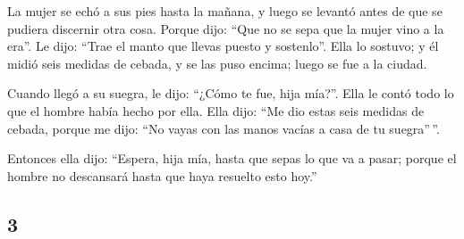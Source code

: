 \begin{paracol}{2}
 La mujer se echó a sus pies hasta la mañana, y luego se
levantó antes de que se pudiera discernir otra cosa. Porque dijo: ``Que
no se sepa que la mujer vino a la era''.  Le dijo: ``Trae
el manto que llevas puesto y sostenlo''. Ella lo sostuvo; y él midió
seis medidas de cebada, y se las puso encima; luego se fue a la ciudad.

 Cuando llegó a su suegra, le dijo: ``¿Cómo te fue, hija
mía?''. Ella le contó todo lo que el hombre había hecho por ella.
 Ella dijo: ``Me dio estas seis medidas de cebada, porque
me dijo: ``No vayas con las manos vacías a casa de tu suegra''\,''.

 Entonces ella dijo: ``Espera, hija mía, hasta que sepas
lo que va a pasar; porque el hombre no descansará hasta que haya
resuelto esto hoy.''

\switchcolumn
\begin{otherlanguage}{english}

\hypertarget{section-5}{%
\section{3}\label{section-5}}


\end{otherlanguage}
\end{paracol}
